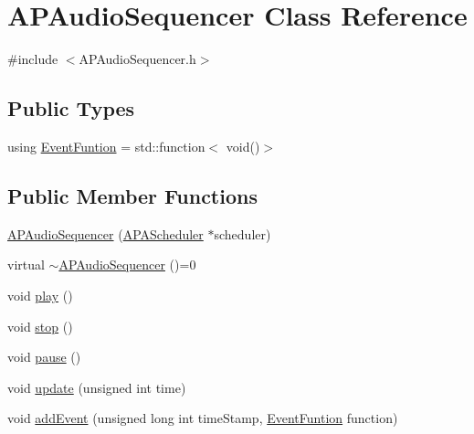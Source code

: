 \hypertarget{class_a_p_audio_sequencer}{\section{A\+P\+Audio\+Sequencer Class Reference}
\label{class_a_p_audio_sequencer}
}


{\ttfamily \#include $<$A\+P\+Audio\+Sequencer.\+h$>$}

\subsection*{Public Types}
\begin{DoxyCompactItemize}
\item 
using \hyperlink{class_a_p_audio_sequencer_a4f96204d50dc06c979b8e0c09b046a2b}{Event\+Funtion} = std\+::function$<$ void()$>$
\end{DoxyCompactItemize}
\subsection*{Public Member Functions}
\begin{DoxyCompactItemize}
\item 
\hyperlink{class_a_p_audio_sequencer_ae1e53ad1a0808ff7c942e79ef819736c}{A\+P\+Audio\+Sequencer} (\hyperlink{class_a_p_a_scheduler}{A\+P\+A\+Scheduler} $\ast$scheduler)
\item 
virtual \hyperlink{class_a_p_audio_sequencer_a4cc53d52ae6bb80d40a3ec68a45771b1}{$\sim$\+A\+P\+Audio\+Sequencer} ()=0
\item 
void \hyperlink{class_a_p_audio_sequencer_a24306de5cdb11b5ed0a39ba4302656be}{play} ()
\item 
void \hyperlink{class_a_p_audio_sequencer_a3594430fcc5c1eeb6ea4089b6a80fcac}{stop} ()
\item 
void \hyperlink{class_a_p_audio_sequencer_a997cee9c25c4674a2613229a084b0b53}{pause} ()
\item 
void \hyperlink{class_a_p_audio_sequencer_ae674b378535e41603b35d3eebd13c54c}{update} (unsigned int time)
\item 
void \hyperlink{class_a_p_audio_sequencer_ae81718f3568600e54e5cc42e96adc42b}{add\+Event} (unsigned long int time\+Stamp, \hyperlink{class_a_p_audio_sequencer_a4f96204d50dc06c979b8e0c09b046a2b}{Event\+Funtion} function)
\end{DoxyCompactItemize}


